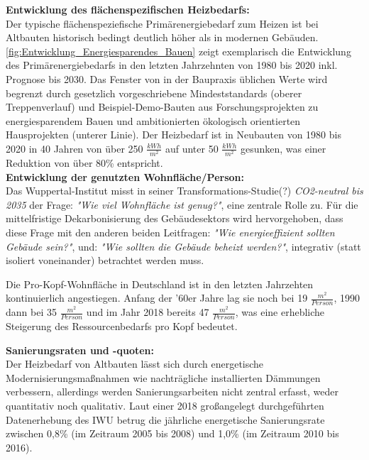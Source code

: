 				\textbf{Entwicklung des flächenspezifischen Heizbedarfs:}\\
				Der typische flächenspeziefische Primärenergiebedarf zum Heizen ist bei Altbauten historisch bedingt deutlich höher als in modernen Gebäuden.  \autoref{fig:Entwicklung_Energiesparendes_Bauen} zeigt exemplarisch die Entwicklung des Primärenergiebedarfs in den letzten Jahrzehnten von 1980 bis 2020 inkl. Prognose bis 2030. Das Fenster von in der Baupraxis üblichen Werte wird begrenzt durch gesetzlich vorgeschriebene Mindeststandards (oberer Treppenverlauf) und Beispiel-Demo-Bauten aus Forschungsprojekten zu energiesparendem Bauen und ambitionierten ökologisch orientierten Hausprojekten (unterer Linie). Der Heizbedarf ist in Neubauten von 1980 bis 2020 in 40 Jahren von über 250 $\frac{kWh}{m^2}$ auf unter 50 $\frac{kWh}{m^2}$ gesunken, was einer Reduktion von über 80\% entspricht. \cite{IBP_Abb_Entwicklung_Energiesparendes_Bauen}\\
				
				\textbf{Entwicklung der genutzten Wohnfläche/Person:}\\
				Das Wuppertal-Institut misst in seiner Transformations-Studie(?) \textit{CO2-neutral bis 2035} der Frage: \textit{"Wie viel Wohnfläche ist genug?"}, eine zentrale Rolle zu. Für die mittelfristige Dekarbonisierung des Gebäudesektors wird hervorgehoben, dass diese Frage mit den anderen beiden Leitfragen: \textit{"Wie energieeffizient sollten Gebäude sein?"}, und: \textit{"Wie sollten die Gebäude beheizt werden?"}, integrativ (statt isoliert voneinander) betrachtet werden muss. 
				
				Die Pro-Kopf-Wohnfläche in Deutschland ist in den letzten Jahrzehten kontinuierlich angestiegen. Anfang der '60er Jahre lag sie noch bei 19 $\frac{m^2}{Person}$, 1990 dann bei 35 $\frac{m^2}{Person}$ und im Jahr 2018 bereits 47 $\frac{m^2}{Person}$, was eine erhebliche Steigerung des Ressourcenbedarfs pro Kopf bedeutet. \cite[S.~93]{Wuppertal_Institut_CO2_neutral_2035} 
				
				\textbf{Sanierungsraten und -quoten:}\\
				Der Heizbedarf von Altbauten lässt sich durch energetische Modernisierungsmaßnahmen wie nachträgliche installierten Dämmungen verbessern, allerdings werden Sanierungsarbeiten nicht zentral erfasst, weder quantitativ noch qualitativ. Laut einer 2018 großangelegt durchgeführten Datenerhebung des IWU betrug die jährliche energetische Sanierungsrate zwischen 0,8\% (im Zeitraum 2005 bis 2008) und 1,0\% (im Zeitraum 2010 bis 2016). 
				\cite[S.~149]{IWU_2018_Wohngebäudebestand_2016}
				
